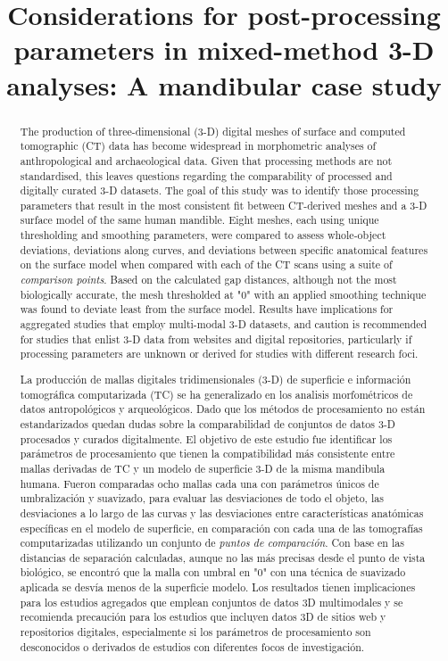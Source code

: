 \documentclass[review]{elsarticle}
\begin{document}
\begin{frontmatter}

\title{Considerations for post-processing parameters in mixed-method 3-D analyses: A mandibular case study}

\begin{abstract}
The production of three-dimensional (3-D) digital meshes of surface and computed tomographic (CT) data has become widespread in morphometric analyses of anthropological and archaeological data. Given that processing methods are not standardised, this leaves questions regarding the comparability of processed and digitally curated 3-D datasets. The goal of this study was to identify those processing parameters that result in the most consistent fit between CT-derived meshes and a 3-D surface model of the same human mandible. Eight meshes, each using unique thresholding and smoothing parameters, were compared to assess whole-object deviations, deviations along curves, and deviations between specific anatomical features on the surface model when compared with each of the CT scans using a suite of \textit{comparison points}. Based on the calculated gap distances, although not the most biologically accurate, the mesh thresholded at "0" with an applied smoothing technique was found to deviate least from the surface model. Results have implications for aggregated studies that employ multi-modal 3-D datasets, and caution is recommended for studies that enlist 3-D data from websites and digital repositories, particularly if processing parameters are unknown or derived for studies with different research foci.

\newpage
La producción de mallas digitales tridimensionales (3-D) de superficie e información tomográfica computarizada (TC) se ha generalizado en los analisis morfométricos de datos antropológicos y arqueológicos. Dado que los métodos de procesamiento no están estandarizados quedan dudas sobre la comparabilidad de conjuntos de datos 3-D procesados y curados digitalmente. El objetivo de este estudio fue identificar los parámetros de procesamiento que tienen la compatibilidad más consistente entre mallas derivadas de TC y un modelo de superficie 3-D de la misma mandibula humana. Fueron comparadas ocho mallas cada una con parámetros únicos de umbralización y suavizado, para evaluar las desviaciones de todo el objeto, las desviaciones a lo largo de las curvas y las desviaciones entre características anatómicas específicas en el modelo de superficie, en comparación con cada una de las tomografías computarizadas utilizando un conjunto de \textit{puntos de comparación}. Con base en las distancias de separación calculadas, aunque no las más precisas desde el punto de vista biológico, se encontró que la malla con umbral en "0" con una técnica de suavizado aplicada se desvía menos de la superficie modelo. Los resultados tienen implicaciones para los estudios agregados que emplean conjuntos de datos 3D multimodales y se recomienda precaución para los estudios que incluyen datos 3D de sitios web y repositorios digitales, especialmente si los parámetros de procesamiento son desconocidos o derivados de estudios con diferentes focos de investigación.
\end{abstract}


\end{frontmatter}
\end{document}
